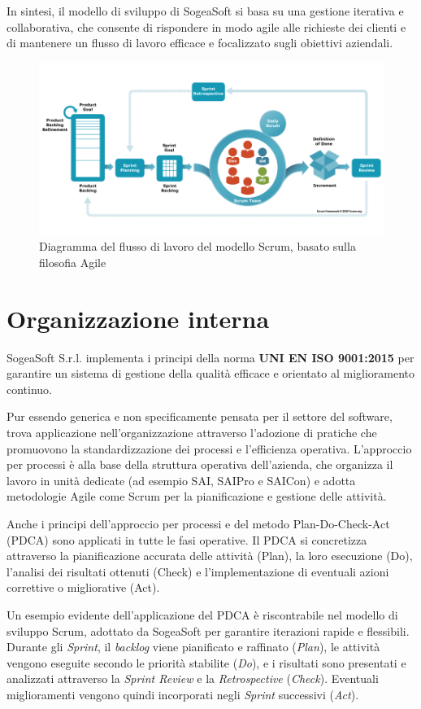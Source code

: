     \noindent In sintesi, il modello di sviluppo di SogeaSoft si basa su una gestione iterativa e collaborativa, che consente di rispondere in modo agile alle richieste dei clienti e di mantenere un flusso di lavoro efficace e focalizzato sugli obiettivi aziendali.

    \begin{figure}[H]
        \centering
        \includegraphics[width=0.8\linewidth]{BCS-Tessi/images/scrum_flow.png}
        \caption{Diagramma del flusso di lavoro del modello Scrum, basato sulla filosofia Agile}
        \label{fig:scrum_flow}
    \end{figure}
    
    \section{Organizzazione interna}
    SogeaSoft S.r.l. implementa i principi della norma \textbf{UNI EN ISO 9001:2015} per garantire un sistema di gestione della qualità efficace e orientato al miglioramento continuo. 
    
    \noindent Pur essendo generica e non specificamente pensata per il settore del software, trova applicazione nell’organizzazione attraverso l’adozione di pratiche che promuovono la standardizzazione dei processi e l’efficienza operativa. L'approccio per processi è alla base della struttura operativa dell'azienda, che organizza il lavoro in unità dedicate (ad esempio SAI, SAIPro e SAICon) e adotta metodologie Agile come Scrum per la pianificazione e gestione delle attività. 

    \noindent Anche i principi dell’approccio per processi e del metodo Plan-Do-Check-Act (PDCA) sono applicati in tutte le fasi operative. Il PDCA si concretizza attraverso la pianificazione accurata delle attività (Plan), la loro esecuzione (Do), l’analisi dei risultati ottenuti (Check) e l’implementazione di eventuali azioni correttive o migliorative (Act).

    \noindent Un esempio evidente dell’applicazione del PDCA è riscontrabile nel modello di sviluppo Scrum, adottato da SogeaSoft per garantire iterazioni rapide e flessibili. Durante gli \textit{Sprint}, il \textit{backlog} viene pianificato e raffinato (\textit{Plan}), le attività vengono eseguite secondo le priorità stabilite (\textit{Do}), e i risultati sono presentati e analizzati attraverso la \textit{Sprint Review} e la \textit{Retrospective} (\textit{Check}). Eventuali miglioramenti vengono quindi incorporati negli \textit{Sprint} successivi (\textit{Act}).
    
